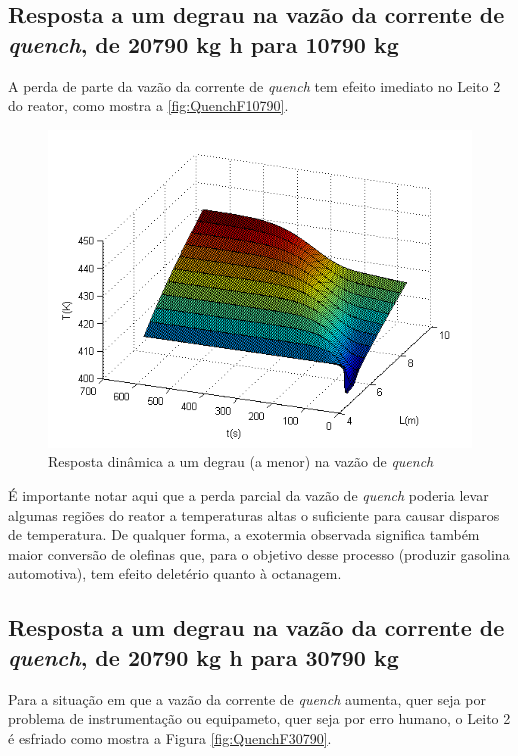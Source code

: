 \subsection{Resposta a um degrau na vazão da corrente de \emph{quench}, de 20790
kg h para 10790 kg} \label{sec:respostaaumdegrauvazao1}

A perda de parte da vazão da corrente de \emph{quench} tem efeito imediato no
Leito 2 do reator, como mostra a \autoref{fig:QuenchF10790}.

\begin{figure}[htb]
\centering
\includegraphics[scale=0.8]{images/Chap4/QuenchF10790.png}
\caption{Resposta dinâmica a um degrau (a menor) na vazão de \emph{quench}}
\label{fig:QuenchF10790}
\end{figure}

É importante notar aqui que a perda parcial da vazão de \emph{quench} poderia
levar algumas regiões do reator a temperaturas altas o suficiente para causar
disparos de temperatura. De qualquer forma, a exotermia observada significa
também maior conversão de olefinas que, para o objetivo desse processo (produzir
gasolina automotiva), tem efeito deletério quanto à octanagem.

\subsection{Resposta a um degrau na vazão da corrente de \emph{quench}, de 20790
kg h para 30790 kg} \label{sec:respostaaumdegrauvazao3}

Para a situação em que a vazão da corrente de \emph{quench} aumenta, quer seja
por problema de instrumentação ou equipameto, quer seja por erro humano, o Leito
2 é esfriado como mostra a Figura \autoref{fig:QuenchF30790}.

